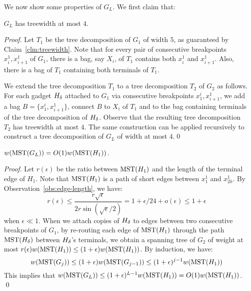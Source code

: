   
\noindent We now show some properties of $G_L$. We first claim that:

\begin{claim}\label{clm:tw-GL} $G_L$ has treewidth at most $4$.
\end{claim}
\begin{proof}
	Let $T_1$ be the tree decomposition of $G_1$ of width $5$, as guaranteed by Claim~\ref{clm:treewidth}. Note that for every pair of consecutive breakpoints $x^1_i,x^1_{i+1}$ of $G_1$, there is a bag, say $X_i$, of $T_1$ contains both $x^1_i$ and $x^1_{i+1}$. Also, there is a bag of $T_1$ containing both terminals of $T_1$.
	
	We extend the tree decomposition $T_1$ to a tree decomposition $T_2$  of $G_2$ as follows. For each gadget $H_{\delta}$ attached to $G_1$ via consecutive breakpoints $x_1^i,x^1_{i+1}$, we add a bag $B = \{ x_1^i,x^1_{i+1}\}$, connect $B$ to $X_i$ of $T_1$ and to the bag containing terminals of the tree decomposition of $H_{\delta}$. Observe that the resulting tree decomposition $T_2$ has treewidth at most $4$. The same construction can be applied recursively to construct a tree decomposition of $G_L$ of width at most $4$.\qed
\end{proof}

\begin{claim}\label{clm:mst-GL} $w(\mathrm{MST}(G_L)) = O(1) w(\mathrm{MST}(H_1))$.
\end{claim}
\begin{proof}
	Let $r(\epsilon)$ be the ratio between $\mathrm{MST}(H_1)$ and the length of the terminal edge of $H_1$.  Note that $\mathrm{MST}(H_1)$ is a path of short edges between $x_1^1$ and $x^1_{2k}$. By Observation~\ref{obs:edge-length}, we have:
	\begin{equation}
	r(\epsilon)  \leq \frac{r\sqrt{\epsilon}}{2r\sin(\sqrt{\epsilon}/2)}  = 1+\epsilon/24 + o(\epsilon) \leq  1+\epsilon
	\end{equation}
	when $\epsilon \ll 1$. When we attach copies of $H_{\delta}$ to edges between two consecutive breakpoints of $G_1$, by re-routing each edge of $\mathrm{MST}(H_1)$ through the path $\mathrm{MST}(H_{\delta})$ between $H_{\delta}$'s terminals, we obtain a spanning tree of $G_2$ of weight at most $r(\epsilon)w(\mathrm{MST}(H_1)) \leq (1+\epsilon)w(\mathrm{MST}(H_1))$. By induction, we have:
	\begin{equation*}
	w(\mathrm{MST}(G_j)) \leq (1+\epsilon)w(\mathrm{MST}(G_{j-1})) \leq (1+\epsilon)^{j-1} w(\mathrm{MST}(H_1))
	\end{equation*}
This implies that $w(\mathrm{MST}(G_L)) \leq (1+\epsilon)^{L-1}w(\mathrm{MST}(H_1)) = O(1)w(\mathrm{MST}(H_1))$. \qed
\end{proof}

